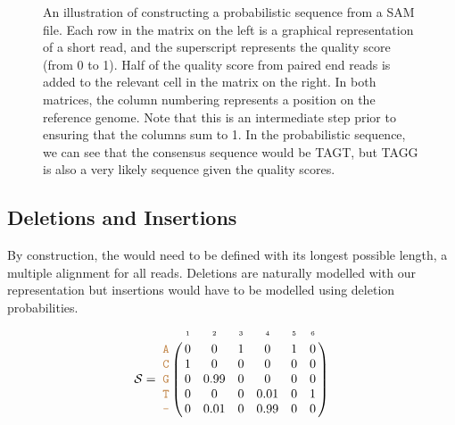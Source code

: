\documentclass[12pt]{article}
\begin{document}
\begin{figure}[h!]
\caption{\label{fig:paired_diagram}An illustration of constructing a probabilistic sequence from a SAM file. Each row in the matrix on the left is a graphical representation of a short read, and the superscript represents the quality score (from 0 to 1). Half of the quality score from paired end reads is added to the relevant cell in the matrix on the right. In both matrices, the column numbering represents a position on the reference genome. Note that this is an intermediate step prior to ensuring that the columns sum to 1. In the probabilistic sequence, we can see that the consensus sequence would be TAGT, but TAGG is also a very likely sequence given the quality scores.}
\end{figure}

\subsection{Deletions and Insertions}


By construction, the \nlps would need to be defined with its longest possible length, \ie a multiple alignment for all reads.
Deletions are naturally modelled with our representation but insertions would have to be modelled using deletion probabilities. 
\begin{equation}
\label{eq:indel}
\nps = 
\bordermatrix{
&\scriptscriptstyle{1} & \scriptscriptstyle{2}& \scriptscriptstyle{3}& \scriptscriptstyle{4} & \scriptscriptstyle{5} & \scriptscriptstyle{6} \cr
\sq{A} & 0 & 0   & 1 & 0    & 1 & 0\cr
\sq{C} & 1 & 0    & 0 & 0    & 0 & 0\cr
\sq{G} & 0 & 0.99 & 0 & 0    & 0 & 0\cr
\sq{T} & 0 & 0    & 0 & 0.01 & 0 & 1\cr
\sq{-} & 0 & 0.01 & 0 & 0.99 & 0 & 0\cr
}
\end{equation}
\end{document}
